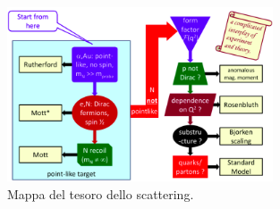 \begin{figure}[H]
    \centering
    \includegraphics[width=0.7\textwidth]{immagini/fig_treasure_map_scattering}
    \caption{Mappa del tesoro dello scattering.}
\end{figure}
